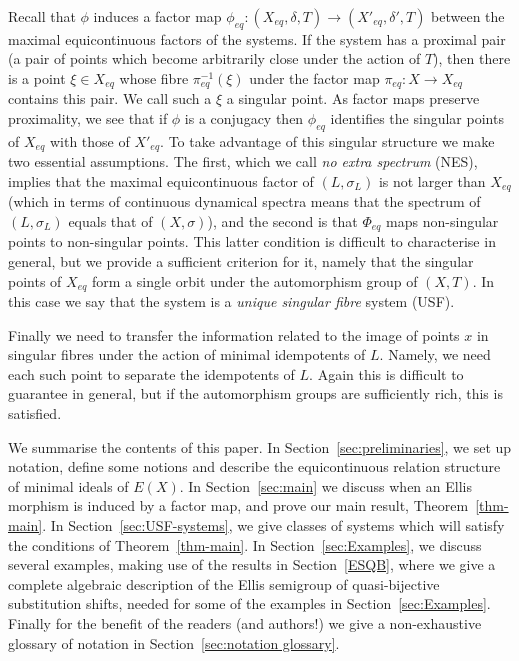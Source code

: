 \documentclass[12pt]{amsart}
\theoremstyle{definition}
\numberwithin{equation}{section}
\newcommand{\Xe}{X_{eq}}
\newcommand{\pe}{\pi_{eq}}
\begin{document}
Recall that $\phi$ induces a factor map $\phi_{eq}: (\Xe, \delta,T)\rightarrow (X'_{eq}, \delta',T)$ between the maximal equicontinuous factors of the systems.  
If the system  has a  proximal pair (a pair of points which become arbitrarily close under the action of $T$), then there is a point $\xi\in \Xe$ whose fibre $\pe^{-1}(\xi)$ under the factor map $\pe:X\to \Xe$ contains this pair. We call such a $\xi$ a singular point. As factor maps preserve proximality, we see that if $\phi$ is a conjugacy then 
$\phi_{eq}$ identifies the singular points of $\Xe$ with those of $X'_{eq}$. 
To take advantage of this singular structure we make two essential assumptions. The first, which we call \emph{no extra spectrum} (NES), implies that the maximal equicontinuous factor of $(L,\sigma_L)$ is not larger than $\Xe$ (which in terms of continuous dynamical spectra means that the spectrum of $(L,\sigma_L)$ {equals} that of $(X,\sigma)$), and the second is that $\Phi_{eq}$ maps non-singular points to non-singular points. This latter condition is difficult to characterise in general, but we provide a sufficient criterion for it, namely that the singular points of $\Xe$ form a single orbit under the automorphism group of $(X,T)$.  In this case  we say that the system is a \emph{unique singular fibre} system (USF). 

Finally we need to transfer the information related to the image of points $x$ in singular fibres under the action of minimal idempotents of $L$.  Namely, we need each such point to separate the idempotents of $L$. Again this is difficult to guarantee in general, but if the automorphism groups are sufficiently rich, this is satisfied.

We summarise the contents of this paper. In Section~\ref{sec:preliminaries}, we set up notation, define some notions and describe the equicontinuous relation structure  of minimal ideals of $E(X)$. In Section~\ref{sec:main} we discuss when an Ellis morphism is induced by a factor map, and prove our main result, Theorem~\ref{thm-main}. In Section~\ref{sec:USF-systems}, we give classes of systems which will satisfy the conditions of Theorem~\ref{thm-main}. In Section~\ref{sec:Examples}, we discuss several examples, making use of the results in Section~\ref{ESQB}, where we give a complete algebraic description of the Ellis semigroup of quasi-bijective substitution shifts, needed for some of the examples in Section~\ref{sec:Examples}. Finally for the benefit of the readers (and authors!) we give a non-exhaustive glossary of notation in Section~\ref{sec:notation glossary}.
\end{document}
